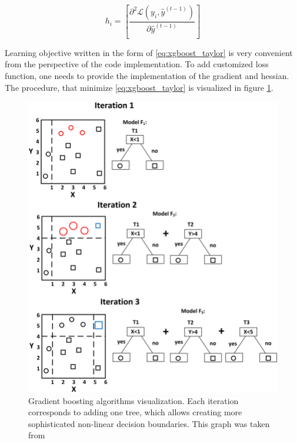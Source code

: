 \begin{equation}
    h_i = \left[\frac{\partial^2 \mathcal{L}(y_{i},\hat{y}^{(t-1)})}{\partial \hat{y}^{(t-1)}} \right]
\end{equation}

Learning objective written in the form of \ref{eq:xgboost_taylor} is very convenient from the perspective of the code implementation. To add customized loss function, one needs to provide the implementation of the gradient and hessian. The procedure, that minimize \ref{eq:xgboost_taylor} is visualized in figure \ref{fig:GB_visualization}. 

\begin{figure}
\centering
\includegraphics[scale=0.8]{figures/GB_visualization.png}
\caption{Gradient boosting algorithms visualization. Each iteration corresponds to adding one tree, which allows creating more sophisticated non-linear decision boundaries. 
This graph was taken from \cite{GB_visualization}
\label{fig:GB_visualization}}
\end{figure}
  
